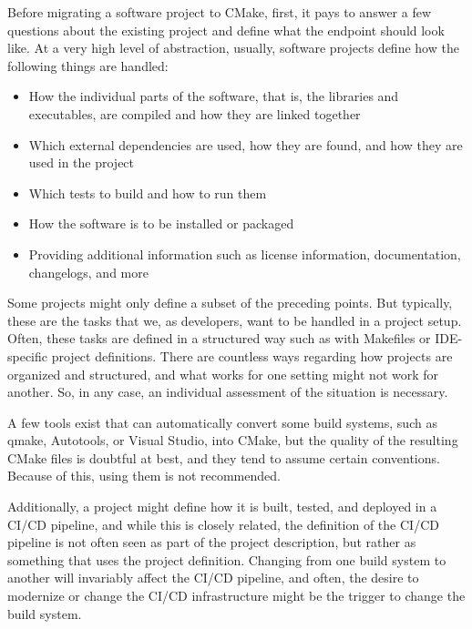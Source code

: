 Before migrating a software project to CMake, first, it pays to answer a few questions about the existing project and define what the endpoint should look like. At a very high level of abstraction, usually, software projects define how the following things are handled:

\begin{itemize}
\item 
How the individual parts of the software, that is, the libraries and executables, are compiled and how they are linked together

\item 
Which external dependencies are used, how they are found, and how they are used in the project

\item 
Which tests to build and how to run them

\item 
How the software is to be installed or packaged

\item 
Providing additional information such as license information, documentation, changelogs, and more
\end{itemize}

Some projects might only define a subset of the preceding points. But typically, these are the tasks that we, as developers, want to be handled in a project setup. Often, these tasks are defined in a structured way such as with Makefiles or IDE-specific project definitions. There are countless ways regarding how projects are organized and structured, and what works for one setting might not work for another. So, in any case, an individual assessment of the situation is necessary.

A few tools exist that can automatically convert some build systems, such as qmake, Autotools, or Visual Studio, into CMake, but the quality of the resulting CMake files is doubtful at best, and they tend to assume certain conventions. Because of this, using them is not recommended.

Additionally, a project might define how it is built, tested, and deployed in a CI/CD pipeline, and while this is closely related, the definition of the CI/CD pipeline is not often seen as part of the project description, but rather as something that uses the project definition. Changing from one build system to another will invariably affect the CI/CD pipeline, and often, the desire to modernize or change the CI/CD infrastructure might be the trigger to change the build system.

